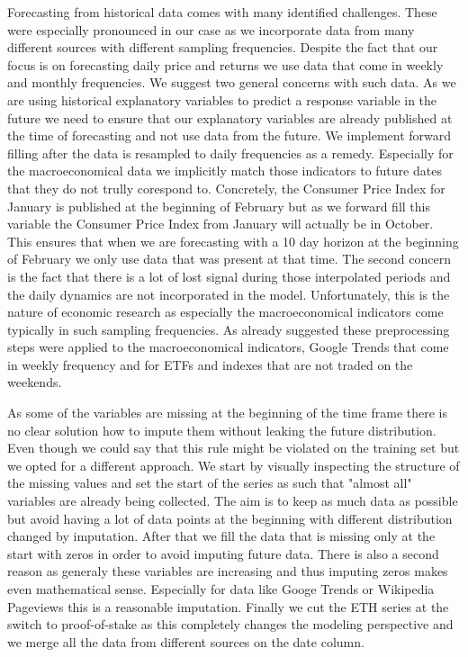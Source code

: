 Forecasting from historical data comes with many identified challenges. These
were especially pronounced in our case as we incorporate data from many
different sources with different sampling frequencies. Despite the fact
that our focus is on forecasting daily price and returns we use data
that come in weekly and monthly frequencies. We suggest two general concerns 
with such data. As we are using historical explanatory variables
to predict a response variable in the future we need to ensure that our
explanatory variables are already published at the time of forecasting and not
use data from the future. We implement forward filling after the data is resampled
to daily frequencies as a remedy. Especially for the macroeconomical data
we implicitly match those indicators to future dates that they do not trully
corespond to. Concretely, the Consumer Price Index for January is published at the 
beginning of February but as we forward fill this variable the Consumer Price Index
from January will actually be in October. This ensures that when we are 
forecasting with a 10 day horizon at the beginning of February we only use
data that was present at that time. The second concern is the fact 
that there is a lot of lost signal during those interpolated periods 
and the daily dynamics are not incorporated in the model. Unfortunately,
this is the nature of economic research as especially the 
macroeconomical indicators come typically in such sampling frequencies.
As already suggested these preprocessing steps were applied to the macroeconomical
indicators, Google Trends that come in weekly frequency and for 
ETFs and indexes that are not traded on the weekends.

As some of the variables are missing at the beginning of the time frame there
is no clear solution how to impute them without leaking the future distribution.
Even though we could say that this rule might be violated on the training set
but we opted for a different approach.
We start by visually inspecting the structure of the missing values and 
set the start of the series as such that "almost all" variables are already 
being collected. The aim is to keep as much data as possible but avoid
having a lot of data points at the beginning with different distribution changed 
by imputation. After that we fill the data that is missing only at the start with
zeros in order to avoid imputing future data. There is also a second reason
as generaly these variables are increasing and thus imputing zeros makes 
even mathematical sense. Especially for data like Googe Trends or Wikipedia
Pageviews this is a reasonable imputation. Finally we cut the 
\ac{ETH} series at the switch to proof-of-stake as this completely
changes the modeling perspective and we merge all the data
from different sources on the date column.


